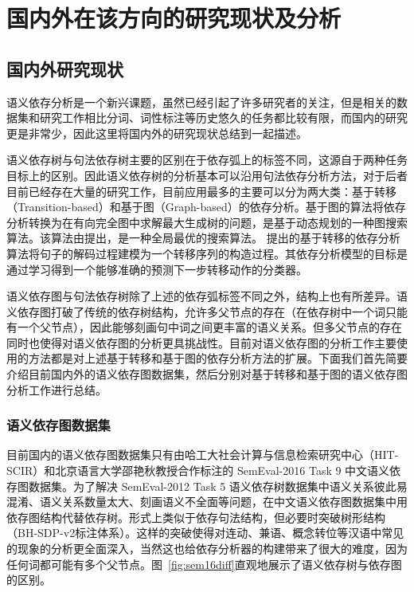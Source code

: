 
\section{国内外在该方向的研究现状及分析}
\subsection{国内外研究现状}

语义依存分析是一个新兴课题，虽然已经引起了许多研究者的关注，但是相关的数据集和研究工作相比分词、词性标注等历史悠久的任务都比较有限，而国内的研究更是非常少，因此这里将国内外的研究现状总结到一起描述。

语义依存树与句法依存树主要的区别在于依存弧上的标签不同，这源自于两种任务目标上的区别。因此语义依存树的分析基本可以沿用句法依存分析方法，对于后者目前已经存在大量的研究工作，目前应用最多的主要可以分为两大类：基于转移（Transition-based）和基于图（Graph-based）的依存分析。基于图的算法将依存分析转换为在有向完全图中求解最大生成树的问题，是基于动态规划的一种图搜索算法。该算法由提出，是一种全局最优的搜索算法。 提出的基于转移的依存分析算法将句子的解码过程建模为一个转移序列的构造过程。其依存分析模型的目标是通过学习得到一个能够准确的预测下一步转移动作的分类器。

语义依存图与句法依存树除了上述的依存弧标签不同之外，结构上也有所差异。语义依存图打破了传统的依存树结构，允许多父节点的存在（在依存树中一个词只能有一个父节点），因此能够刻画句中词之间更丰富的语义关系。但多父节点的存在同时也使得对语义依存图的分析更具挑战性。目前对语义依存图的分析工作主要使用的方法都是对上述基于转移和基于图的依存分析方法的扩展。下面我们首先简要介绍目前国内外的语义依存图数据集，然后分别对基于转移和基于图的语义依存图分析工作进行总结。

\subsubsection{语义依存图数据集}

目前国内的语义依存图数据集只有由哈工大社会计算与信息检索研究中心（HIT-SCIR）和北京语言大学邵艳秋教授合作标注的 SemEval-2016 Task 9 中文语义依存图数据集。为了解决 SemEval-2012 Task 5 语义依存树数据集中语义关系彼此易混淆、语义关系数量太大、刻画语义不全面等问题，在中文语义依存图数据集中用依存图结构代替依存树。形式上类似于依存句法结构，但必要时突破树形结构（BH-SDP-v2标注体系）。这样的突破使得对连动、兼语、概念转位等汉语中常见的现象的分析更全面深入，当然这也给依存分析器的构建带来了很大的难度，因为任何词都可能有多个父节点。图~\ref{fig:sem16diff}直观地展示了语义依存树与依存图的区别。

